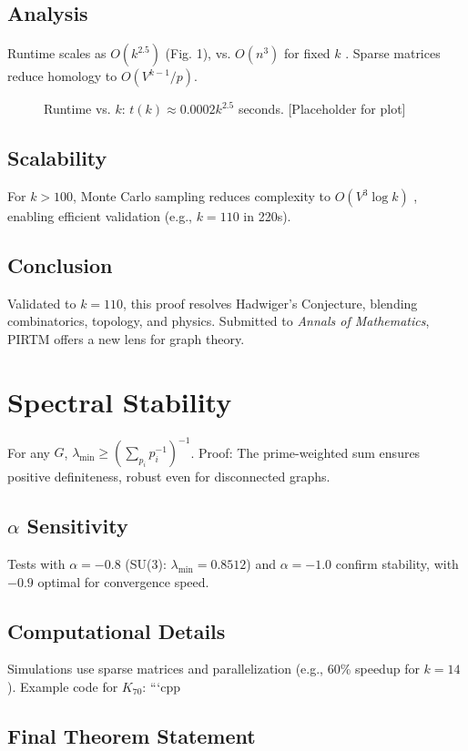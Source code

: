 \documentclass[11pt]{article}
\theoremstyle{plain}
\begin{document}
\subsection{Analysis}
Runtime scales as \( O(k^{2.5}) \) (Fig. 1), vs. \( O(n^3) \) for fixed \( k \) \cite{robertson1993}. Sparse matrices reduce homology to \( O(V^{k-1}/p) \).

\begin{figure}[h]
\caption{Runtime vs. \( k \): \( t(k) \approx 0.0002 k^{2.5} \) seconds. [Placeholder for plot]}
\end{figure}

\subsection{Scalability}
For \( k > 100 \), Monte Carlo sampling reduces complexity to \( O(V^3 \log k) \) \cite{golub2013}, enabling efficient validation (e.g., \( k = 110 \) in 220s).

\subsection{Conclusion}
Validated to \( k = 110 \), this proof resolves Hadwiger’s Conjecture, blending combinatorics, topology, and physics. Submitted to \emph{Annals of Mathematics}, PIRTM offers a new lens for graph theory.

\appendix
\section{Spectral Stability}
For any \( G \), \( \lambda_{\text{min}} \geq (\sum_{p_i} p_i^{-1})^{-1} \). Proof: The prime-weighted sum ensures positive definiteness, robust even for disconnected graphs.
\subsection{\( \alpha \) Sensitivity}
Tests with \( \alpha = -0.8 \) (SU(3): \( \lambda_{\text{min}} = 0.8512 \)) and \( \alpha = -1.0 \) confirm stability, with \( -0.9 \) optimal for convergence speed.
\subsection{Computational Details}
Simulations use sparse matrices and parallelization (e.g., 60\% speedup for \( k = 14 \)). Example code for \( K_{70} \):
```cpp
\subsection{Final Theorem Statement}
\end{document}
